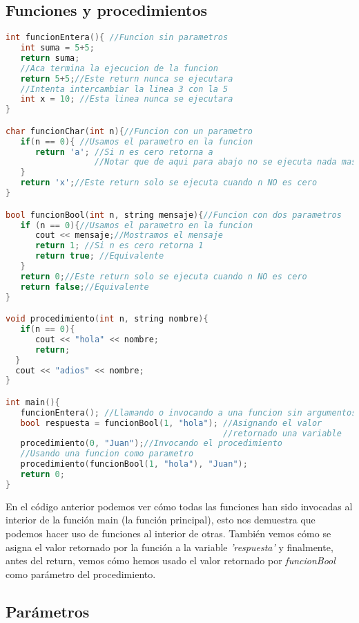 \subsection{Funciones y procedimientos}

\begin{lstlisting}[language=C++]
int funcionEntera(){ //Funcion sin parametros 
   int suma = 5+5;
   return suma; 
   //Aca termina la ejecucion de la funcion 
   return 5+5;//Este return nunca se ejecutara 
   //Intenta intercambiar la linea 3 con la 5 
   int x = 10; //Esta linea nunca se ejecutara
}

char funcionChar(int n){//Funcion con un parametro
   if(n == 0){ //Usamos el parametro en la funcion 
      return 'a'; //Si n es cero retorna a 
                  //Notar que de aqui para abajo no se ejecuta nada mas 
   } 
   return 'x';//Este return solo se ejecuta cuando n NO es cero 
} 

bool funcionBool(int n, string mensaje){//Funcion con dos parametros 
   if (n == 0){//Usamos el parametro en la funcion 
      cout << mensaje;//Mostramos el mensaje 
      return 1; //Si n es cero retorna 1 
      return true; //Equivalente
   } 
   return 0;//Este return solo se ejecuta cuando n NO es cero 
   return false;//Equivalente
}

void procedimiento(int n, string nombre){
   if(n == 0){
      cout << "hola" << nombre; 
      return; 
  } 
  cout << "adios" << nombre;
} 

int main(){ 
   funcionEntera(); //Llamando o invocando a una funcion sin argumentos 
   bool respuesta = funcionBool(1, "hola"); //Asignando el valor 
                                            //retornado una variable 
   procedimiento(0, "Juan");//Invocando el procedimiento 
   //Usando una funcion como parametro 
   procedimiento(funcionBool(1, "hola"), "Juan"); 
   return 0; 
} 
\end{lstlisting}

En el código anterior podemos ver cómo todas las funciones han sido invocadas al interior de la función main (la función principal), esto nos demuestra que podemos hacer uso de funciones al interior de otras. También vemos cómo se asigna el valor retornado por la función a la variable \emph{'respuesta'} y finalmente, antes del return, vemos cómo hemos usado el valor retornado por \emph{funcionBool} como parámetro del procedimiento.

\subsection{Parámetros}


